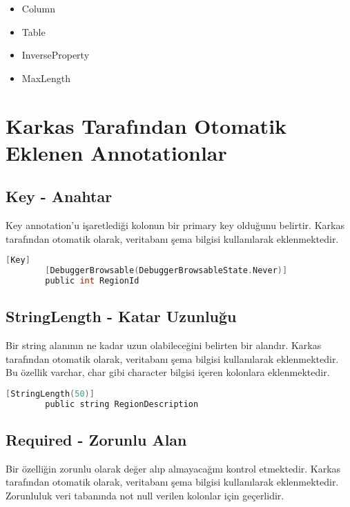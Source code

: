 \documentclass[10pt,a4paper]{article}
\begin{document}
\begin{itemize}

\item  Column

\item Table

\item InverseProperty

\item  MaxLength


\end{itemize}


\section{Karkas Tarafından Otomatik Eklenen Annotationlar}

\subsection{Key - Anahtar}
Key annotation'u işaretlediği kolonun bir primary key olduğunu belirtir.
Karkas tarafından otomatik olarak, veritabanı şema bilgisi kullanılarak eklenmektedir.

\begin{lstlisting}[label=code-Key,caption=Key,language=C]
		[Key]
		[DebuggerBrowsable(DebuggerBrowsableState.Never)]
		public int RegionId
\end{lstlisting}


\subsection{StringLength - Katar Uzunluğu}
Bir string alanının ne kadar uzun olabileceğini belirten bir alandır.
Karkas tarafından otomatik olarak, veritabanı şema bilgisi kullanılarak eklenmektedir.
Bu özellik varchar, char gibi character bilgisi içeren kolonlara eklenmektedir.

\begin{lstlisting}[label=code-StringLength,caption=StringLength,language=C]
		[StringLength(50)]
		public string RegionDescription
\end{lstlisting}



\subsection{Required - Zorunlu Alan}
Bir özelliğin zorunlu olarak değer alıp almayacağını kontrol etmektedir.
Karkas tarafından otomatik olarak, veritabanı şema bilgisi kullanılarak eklenmektedir.
Zorunluluk veri tabanında not null verilen kolonlar için geçerlidir.
\end{document}
